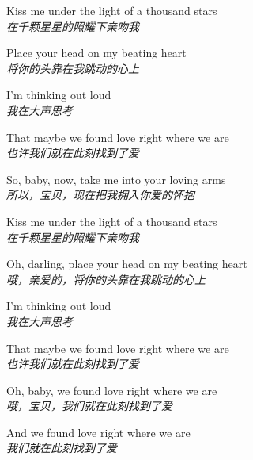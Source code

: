 \begin{spacing}{1.5}
\begin{flushleft}
Kiss me under the light of a thousand stars\\
\textit{在千颗星星的照耀下亲吻我}\lyricspace

Place your head on my beating heart\\
\textit{将你的头靠在我跳动的心上}\lyricspace

I'm thinking out loud\\
\textit{我在大声思考}\lyricspace

That maybe we found love right where we are\\
\textit{也许我们就在此刻找到了爱}\lyricspace

So, baby, now, take me into your loving arms\\
\textit{所以，宝贝，现在把我拥入你爱的怀抱}\lyricspace

Kiss me under the light of a thousand stars\\
\textit{在千颗星星的照耀下亲吻我}\lyricspace

Oh, darling, place your head on my beating heart\\
\textit{哦，亲爱的，将你的头靠在我跳动的心上}\lyricspace

I'm thinking out loud\\
\textit{我在大声思考}\lyricspace

That maybe we found love right where we are\\
\textit{也许我们就在此刻找到了爱}\lyricspace

Oh, baby, we found love right where we are\\
\textit{哦，宝贝，我们就在此刻找到了爱}\lyricspace

And we found love right where we are\\
\textit{我们就在此刻找到了爱}\lyricspace
\end{flushleft}
\end{spacing} 

